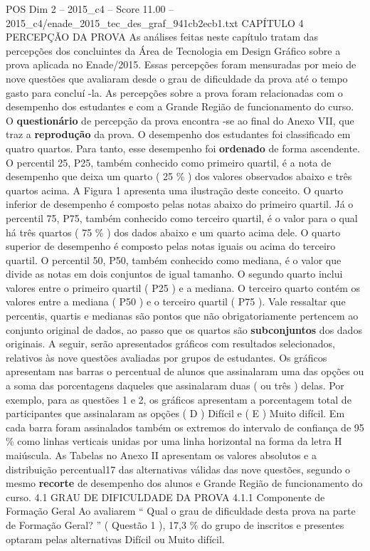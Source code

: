 \begin{textsample}{POS Dim 2 – 2015\_c4 – Score 11.00 – 2015\_c4/enade\_2015\_tec\_des\_graf\_941cb2ecb1.txt}  \label{ex:f2_pos_090}
CAPÍTULO 4 PERCEPÇÃO DA PROVA As análises feitas neste capítulo tratam das percepções dos concluintes da Área de Tecnologia em Design Gráfico sobre a prova aplicada no Enade/2015.
Essas percepções foram mensuradas por meio de nove questões que avaliaram desde o grau de dificuldade da prova até o tempo gasto para concluí -la.
As percepções sobre a prova foram relacionadas com o desempenho dos estudantes e com a Grande Região de funcionamento do curso.
O \textbf{questionário} de percepção da prova encontra -se ao final do Anexo VII, que traz a \textbf{reprodução} da prova.
O desempenho dos estudantes foi classificado em quatro quartos.
Para tanto, esse desempenho foi \textbf{ordenado} de forma ascendente.
O percentil 25, P25, também conhecido como primeiro quartil, é a nota de desempenho que deixa um quarto ( 25 \% ) dos valores observados abaixo e três quartos acima.
A Figura 1 apresenta uma ilustração deste conceito.
O quarto inferior de desempenho é composto pelas notas abaixo do primeiro quartil.
Já o percentil 75, P75, também conhecido como terceiro quartil, é o valor para o qual há três quartos ( 75 \% ) dos dados abaixo e um quarto acima dele.
O quarto superior de desempenho é composto pelas notas iguais ou acima do terceiro quartil.
O percentil 50, P50, também conhecido como mediana, é o valor que divide as notas em dois conjuntos de igual tamanho.
O segundo quarto inclui valores entre o primeiro quartil ( P25 ) e a mediana.
O terceiro quarto contém os valores entre a mediana ( P50 ) e o terceiro quartil ( P75 ).
Vale ressaltar que percentis, quartis e medianas são pontos que não obrigatoriamente pertencem ao conjunto original de dados, ao passo que os quartos são \textbf{subconjuntos} dos dados originais.
A seguir, serão apresentados gráficos com resultados selecionados, relativos às nove questões avaliadas por grupos de estudantes.
Os gráficos apresentam nas barras o percentual de alunos que assinalaram uma das opções ou a soma das porcentagens daqueles que assinalaram duas ( ou três ) delas.
Por exemplo, para as questões 1 e 2, os gráficos apresentam a porcentagem total de participantes que assinalaram as opções ( D ) Difícil e ( E ) Muito difícil.
Em cada barra foram assinalados também os extremos do intervalo de confiança de 95 \% como linhas verticais unidas por uma linha horizontal na forma da letra H maiúscula.
As Tabelas no Anexo II apresentam os valores absolutos e a distribuição percentual17 das alternativas válidas das nove questões, segundo o mesmo \textbf{recorte} de desempenho dos alunos e Grande Região de funcionamento do curso. 4.1 GRAU DE DIFICULDADE DA PROVA 4.1.1 Componente de Formação Geral Ao avaliarem “ Qual o grau de dificuldade desta prova na parte de Formação Geral? ” ( Questão 1 ), 17,3 \% do grupo de inscritos e presentes optaram pelas alternativas Difícil ou Muito difícil.

\end{textsample}
